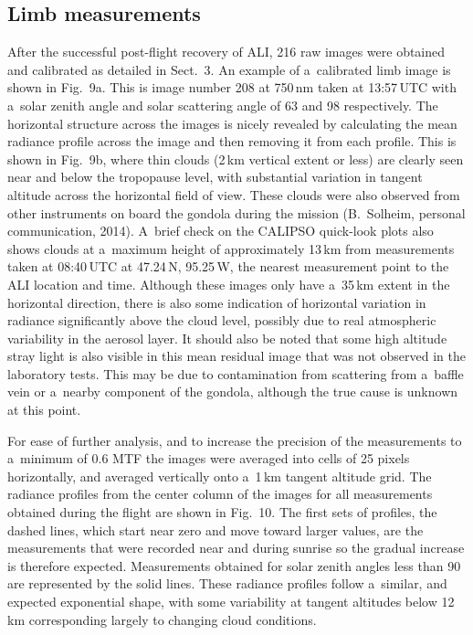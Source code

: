 \documentclass[amtd, online, hvmath]{copernicus}
\begin{document}
\subsection{Limb measurements}

After the successful post-flight recovery of ALI, 216 raw images were
obtained and calibrated as detailed in Sect.~3. An example of a~calibrated
limb image is shown in Fig.~9a. This is image number 208 at 750\,\unit{nm}
taken at 13:57\,UTC with a~solar zenith angle and solar scattering angle of
63 and 98{\degree} respectively. The horizontal structure across the images
is nicely revealed by calculating the mean radiance profile across the image
and then removing it from each profile. This is shown in Fig.~9b, where thin
clouds (2\,\unit{km} vertical extent or less) are clearly seen near and below
the tropopause level, with substantial variation in tangent altitude across
the horizontal field of view. These clouds were also observed from other
instruments on board the gondola during the mission (B.~Solheim, personal
communication, 2014). A~brief check on the CALIPSO quick-look plots also
shows clouds at a~maximum height of approximately 13\,\unit{km} from
measurements taken at 08:40\,UTC at 47.24{\degree}\,N, 95.25{\degree}\,W, the
nearest measurement point to the ALI location and time. Although these images
only have a~35\,\unit{km} extent in the horizontal direction, there is also
some indication of horizontal variation in radiance significantly above the
cloud level, possibly due to real atmospheric variability in the aerosol
layer. It should also be noted that some high altitude stray light is also
visible in this mean residual image that was not observed in the laboratory
tests. This may be due to contamination from scattering from a~baffle vein or
a~nearby component of the gondola, although the true cause is unknown at this
point.

For ease of further analysis, and to increase the precision of the
measurements to a~minimum of 0.6 MTF the images were averaged into
cells of 25 pixels horizontally, and averaged vertically onto
a~1\,\unit{km} tangent altitude grid. The radiance profiles from the
center column of the images for all measurements obtained during the
flight are shown in Fig.~10. The first sets of profiles, the dashed
lines, which start near zero and move toward larger values, are the
measurements that were recorded near and during sunrise so the gradual
increase is therefore expected. Measurements obtained for solar zenith
angles less than 90{\degree} are represented by the solid lines. These
radiance profiles follow a~similar, and expected exponential shape,
with some variability at tangent altitudes below 12\,\unit{km}
corresponding largely to changing cloud conditions.
\end{document}
